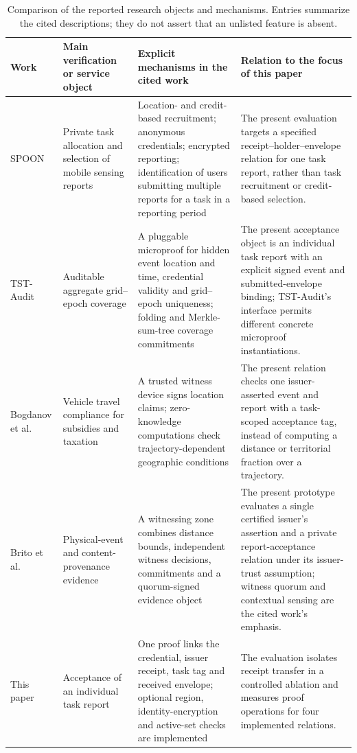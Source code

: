 \documentclass[pdflatex,iicol,sn-mathphys-num]{sn-jnl}
\begin{document}
\begin{table}[t]
\centering\small
\caption{Comparison of the reported research objects and mechanisms. Entries summarize the cited descriptions; they do not assert that an unlisted feature is absent.}\label{tab:comparison-context}
\begin{tabularx}{\textwidth}{@{}p{}p{}p{}X@{}}
\toprule
Work & Main verification or service object & Explicit mechanisms in the cited work & Relation to the focus of this paper \\\midrule
SPOON~\citep{Ni2020SPOON} & Private task allocation and selection of mobile sensing reports & Location- and credit-based recruitment; anonymous credentials; encrypted reporting; identification of users submitting multiple reports for a task in a reporting period & The present evaluation targets a specified receipt--holder--envelope relation for one task report, rather than task recruitment or credit-based selection. \\
TST-Audit~\citep{He2026TSTAudit} & Auditable aggregate grid--epoch coverage & A pluggable microproof for hidden event location and time, credential validity and grid--epoch uniqueness; folding and Merkle-sum-tree coverage commitments & The present acceptance object is an individual task report with an explicit signed event and submitted-envelope binding; TST-Audit's interface permits different concrete microproof instantiations. \\
Bogdanov et al.~\citep{Bogdanov2025VehiclePolicy} & Vehicle travel compliance for subsidies and taxation & A trusted witness device signs location claims; zero-knowledge computations check trajectory-dependent geographic conditions & The present relation checks one issuer-asserted event and report with a task-scoped acceptance tag, instead of computing a distance or territorial fraction over a trajectory. \\
Brito et al.~\citep{Brito2026ContentProvenance} & Physical-event and content-provenance evidence & A witnessing zone combines distance bounds, independent witness decisions, commitments and a quorum-signed evidence object & The present prototype evaluates a single certified issuer's assertion and a private report-acceptance relation under its issuer-trust assumption; witness quorum and contextual sensing are the cited work's emphasis. \\
This paper & Acceptance of an individual task report & One proof links the credential, issuer receipt, task tag and received envelope; optional region, identity-encryption and active-set checks are implemented & The evaluation isolates receipt transfer in a controlled ablation and measures proof operations for four implemented relations. \\
\bottomrule
\end{tabularx}
\end{table}
\end{document}
